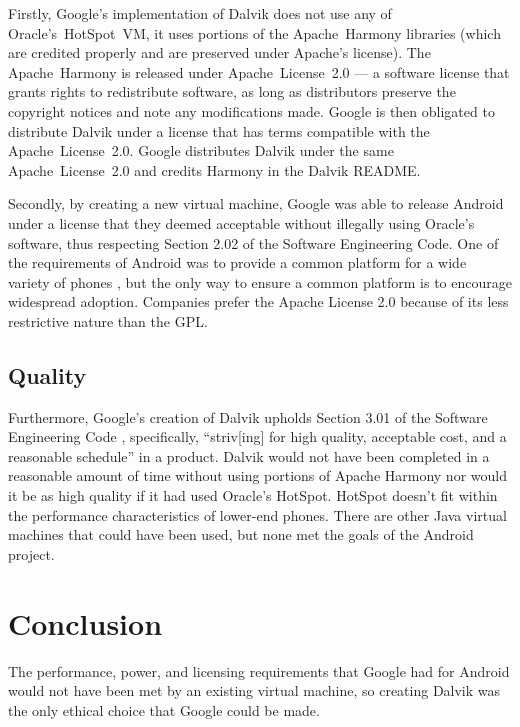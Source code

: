 \documentclass[11pt]{article}
\begin{document}
\begin{multicols}{2}
Firstly, Google's implementation of Dalvik does not use any of
Oracle's~HotSpot~VM, it uses portions of the Apache~Harmony libraries (which are
credited properly \cite{dalvik-readme} and are preserved under Apache's
license).  The Apache~Harmony is released under Apache~License~2.0 --- a
software license that grants rights to redistribute software, as long as
distributors preserve the copyright notices and note any modifications made.
\cite{apache-license} Google is then obligated to distribute Dalvik under a
license that has terms compatible with the Apache~License~2.0.  Google
distributes Dalvik under the same Apache~License~2.0 and credits Harmony in the
Dalvik README.  \cite{dalvik-readme}

Secondly, by creating a new virtual machine, Google was able to release Android
under a license that they deemed acceptable without illegally using Oracle's
software, thus respecting Section 2.02 of the Software Engineering Code.
\cite[\S 2.02]{secode}  One of the requirements of Android was to provide a
common platform for a wide variety of phones \cite{open-handset-alliance-ann},
but the only way to ensure a common platform is to encourage widespread
adoption.  Companies prefer the Apache License 2.0 because of its less
restrictive nature than the GPL. \cite{why-apache2-license}


\subsection{Quality} %
\label{sub:analysis_quality}

Furthermore, Google's creation of Dalvik upholds Section 3.01 of the Software
Engineering Code \cite{secode}, specifically, ``striv[ing] for high quality,
acceptable cost, and a reasonable schedule'' in a product.  Dalvik would not
have been completed in a reasonable amount of time without using portions of
Apache Harmony nor would it be as high quality if it had used Oracle's HotSpot.
HotSpot doesn't fit within the performance characteristics of lower-end phones.
There are other Java virtual machines that could have been used, but none met
the goals of the Android project.



\section{Conclusion} %
\label{sec:conclusion}

The performance, power, and licensing requirements that Google had for Android
would not have been met by an existing virtual machine, so creating Dalvik was
the only ethical choice that Google could be made. 


\end{multicols}
\newpage

\nocite{*}


\end{document}
